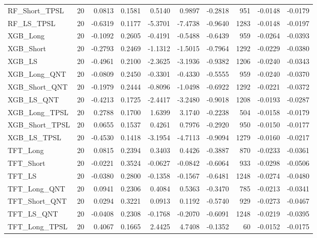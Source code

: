 \begin{tabular}{llrrrrrrrr}
RF\_Short\_TPSL & 20 & 0.0813 & 0.1581 & 0.5140 & 0.9897 & -0.2818 & 951 & -0.0148 & -0.0179 \\
\cline{1-10}
RF\_LS\_TPSL & 20 & -0.6319 & 0.1177 & -5.3701 & -7.4738 & -0.9640 & 1283 & -0.0148 & -0.0197 \\
\cline{1-10}
XGB\_Long & 20 & -0.1092 & 0.2605 & -0.4191 & -0.5488 & -0.6439 & 959 & -0.0264 & -0.0393 \\
\cline{1-10}
XGB\_Short & 20 & -0.2793 & 0.2469 & -1.1312 & -1.5015 & -0.7964 & 1292 & -0.0229 & -0.0380 \\
\cline{1-10}
XGB\_LS & 20 & -0.4961 & 0.2100 & -2.3625 & -3.1936 & -0.9382 & 1206 & -0.0240 & -0.0343 \\
\cline{1-10}
XGB\_Long\_QNT & 20 & -0.0809 & 0.2450 & -0.3301 & -0.4330 & -0.5555 & 959 & -0.0240 & -0.0370 \\
\cline{1-10}
XGB\_Short\_QNT & 20 & -0.1979 & 0.2444 & -0.8096 & -1.0498 & -0.6922 & 1292 & -0.0221 & -0.0372 \\
\cline{1-10}
XGB\_LS\_QNT & 20 & -0.4213 & 0.1725 & -2.4417 & -3.2480 & -0.9018 & 1208 & -0.0193 & -0.0287 \\
\cline{1-10}
XGB\_Long\_TPSL & 20 & 0.2788 & 0.1700 & 1.6399 & 3.1740 & -0.2238 & 504 & -0.0158 & -0.0179 \\
\cline{1-10}
XGB\_Short\_TPSL & 20 & 0.0655 & 0.1537 & 0.4261 & 0.7976 & -0.2920 & 950 & -0.0150 & -0.0177 \\
\cline{1-10}
XGB\_LS\_TPSL & 20 & -0.4530 & 0.1418 & -3.1954 & -4.7113 & -0.9094 & 1279 & -0.0160 & -0.0217 \\
\cline{1-10}
TFT\_Long & 20 & 0.0815 & 0.2394 & 0.3403 & 0.4426 & -0.3887 & 870 & -0.0233 & -0.0361 \\
\cline{1-10}
TFT\_Short & 20 & -0.0221 & 0.3524 & -0.0627 & -0.0842 & -0.6064 & 933 & -0.0298 & -0.0506 \\
\cline{1-10}
TFT\_LS & 20 & -0.0380 & 0.2800 & -0.1358 & -0.1567 & -0.6481 & 1248 & -0.0274 & -0.0480 \\
\cline{1-10}
TFT\_Long\_QNT & 20 & 0.0941 & 0.2306 & 0.4084 & 0.5363 & -0.3470 & 785 & -0.0213 & -0.0341 \\
\cline{1-10}
TFT\_Short\_QNT & 20 & 0.0294 & 0.3221 & 0.0913 & 0.1192 & -0.5740 & 929 & -0.0273 & -0.0467 \\
\cline{1-10}
TFT\_LS\_QNT & 20 & -0.0408 & 0.2308 & -0.1768 & -0.2070 & -0.6091 & 1248 & -0.0219 & -0.0395 \\
\cline{1-10}
TFT\_Long\_TPSL & 20 & 0.4067 & 0.1665 & 2.4425 & 4.7408 & -0.1352 & 60 & -0.0152 & -0.0175 \\

\end{tabular}
